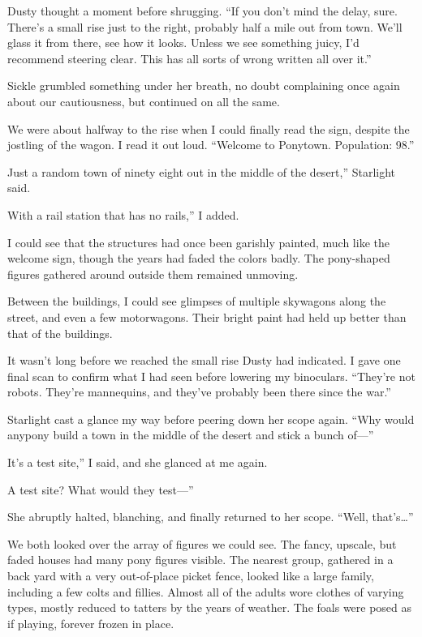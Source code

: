 Dusty thought a moment before shrugging. “If you don’t mind the delay, sure. There’s a small rise just to the right, probably half a mile out from town. We’ll glass it from there, see how it looks. Unless we see something juicy, I’d recommend steering clear. This has all sorts of wrong written all over it.”

Sickle grumbled something under her breath, no doubt complaining once again about our cautiousness, but continued on all the same.

We were about halfway to the rise when I could finally read the sign, despite the jostling of the wagon. I read it out loud. “Welcome to Ponytown. Population: 98.”

\leavevmode{}Just a random town of ninety eight out in the middle of the desert,” Starlight said.

\leavevmode{}With a rail station that has no rails,” I added.

I could see that the structures had once been garishly painted, much like the welcome sign, though the years had faded the colors badly. The pony-shaped figures gathered around outside them remained unmoving.

Between the buildings, I could see glimpses of multiple skywagons along the street, and even a few motorwagons. Their bright paint had held up better than that of the buildings.

It wasn’t long before we reached the small rise Dusty had indicated. I gave one final scan to confirm what I had seen before lowering my binoculars. “They’re not robots. They’re mannequins, and they’ve probably been there since the war.”

Starlight cast a glance my way before peering down her scope again. “Why would anypony build a town in the middle of the desert and stick a bunch of—”

\leavevmode{}It’s a test site,” I said, and she glanced at me again.

\leavevmode{}A test site? What would they test—”

She abruptly halted, blanching, and finally returned to her scope. “Well, that’s…”

We both looked over the array of figures we could see. The fancy, upscale, but faded houses had many pony figures visible. The nearest group, gathered in a back yard with a very out-of-place picket fence, looked like a large family, including a few colts and fillies. Almost all of the adults wore clothes of varying types, mostly reduced to tatters by the years of weather. The foals were posed as if playing, forever frozen in place.


